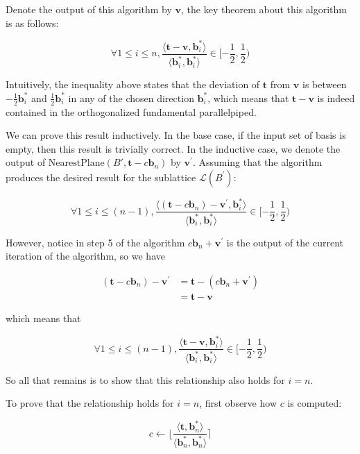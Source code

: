 Denote the output of this algorithm by $\mathbf{v}$, the key theorem about this algorithm is as follows:

$$
\forall 1 \leq i \leq n, 
\frac{
    \langle
        \mathbf{t} - \mathbf{v}, \mathbf{b}_i^\ast
    \rangle
}{
    \langle
        \mathbf{b}_i^\ast, \mathbf{b}_i^\ast
    \rangle
} 
\in [-\frac{1}{2}, \frac{1}{2})
$$

Intuitively, the inequality above states that the deviation of $\mathbf{t}$ from $\mathbf{v}$ is between $-\frac{1}{2}\mathbf{b}_i^\ast$ and $\frac{1}{2}\mathbf{b}_i^\ast$ in any of the chosen direction $\mathbf{b}_i^\ast$, which means that $\mathbf{t} - \mathbf{v}$ is indeed contained in the orthogonalized fundamental parallelpiped.

We can prove this result inductively. In the base case, if the input set of basis is empty, then this result is trivially correct. In the inductive case, we denote the output of $\text{NearestPlane}(B', \mathbf{t} - c\mathbf{b}_n)$ by $\mathbf{v}^\prime$. Assuming that the algorithm produces the desired result for the sublattice $\mathcal{L}(B^\prime)$:

$$
\forall 1 \leq i \leq (n-1), 
\frac{
    \langle
        (\mathbf{t} - c\mathbf{b}_n) - \mathbf{v}^\prime, 
        \mathbf{b}_i^\ast
    \rangle
}{
    \langle
        \mathbf{b}_i^\ast, \mathbf{b}_i^\ast
    \rangle
} \in [-\frac{1}{2}, \frac{1}{2})
$$

However, notice in step 5 of the algorithm $c\mathbf{b}_n + \mathbf{v}^\prime$ is the output of the current iteration of the algorithm, so we have

$$
\begin{aligned}
(\mathbf{t} - c\mathbf{b}_n) - \mathbf{v}^\prime 
&= \mathbf{t} - (c\mathbf{b}_n + \mathbf{v}^\prime) \\
&= \mathbf{t} - \mathbf{v}
\end{aligned}
$$

which means that

$$
\forall 1 \leq i \leq (n-1), 
\frac{
    \langle
        \mathbf{t} - \mathbf{v}, 
        \mathbf{b}_i^\ast
    \rangle
}{
    \langle
        \mathbf{b}_i^\ast, \mathbf{b}_i^\ast
    \rangle
} \in [-\frac{1}{2}, \frac{1}{2})
$$

So all that remains is to show that this relationship also holds for $i = n$.

To prove that the relationship holds for $i = n$, first observe how $c$ is computed:

$$
c \leftarrow \lfloor \frac{\langle\mathbf{t}, \mathbf{b}_n^\ast\rangle}{\langle\mathbf{b}_n^\ast, \mathbf{b}_n^\ast\rangle} \rceil
$$

